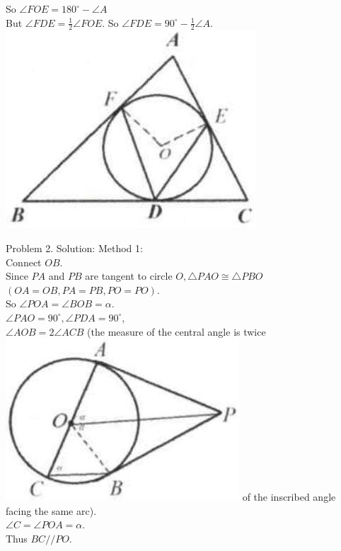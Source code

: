 \documentclass[10pt]{article}
\begin{document}
So \(\angle F O E=180^{\circ}-\angle A\)\\
But \(\angle F D E=\frac{1}{2} \angle F O E\). So \(\angle F D E=90^{\circ}-\frac{1}{2} \angle A\).\\
\includegraphics[max width=\textwidth, center]{2025_04_17_97bc1f7e44d93c271a88g-157(2)}

Problem 2. Solution:
Method 1:\\
Connect \(O B\).\\
Since \(P A\) and \(P B\) are tangent to circle \(O, \triangle P A O \cong \triangle P B O\) \((O A=O B, P A=P B, P O=P O)\).\\
So \(\angle P O A=\angle B O B=\alpha\).\\
\(\angle P A O=90^{\circ}, \angle P D A=90^{\circ}\),\\
\(\angle A O B=2 \angle A C B\) (the measure of the central angle is twice\\
\includegraphics[max width=\textwidth]{2025_04_17_97bc1f7e44d93c271a88g-157} of the inscribed angle facing the same arc).\\
\(\angle C=\angle P O A=\alpha\).\\
Thus \(B C / / P O\).
\end{document}
